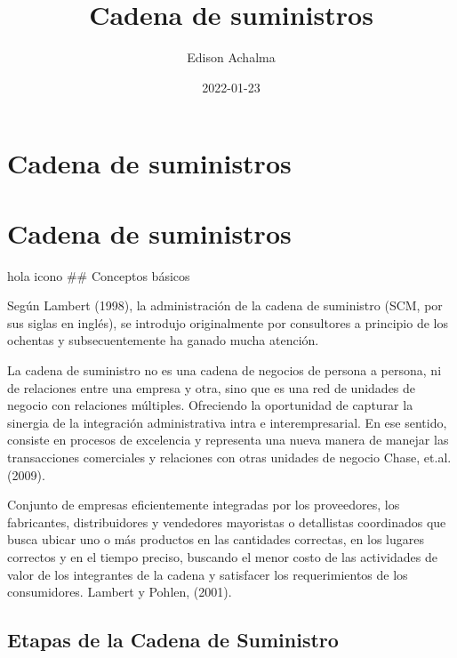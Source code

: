 \documentclass[
  jou,
  floatsintext,
  longtable,
  a4paper,
  nolmodern,
  notxfonts,
  notimes,
  colorlinks=true,linkcolor=blue,citecolor=blue,urlcolor=blue]{apa7}
\title{Cadena de suministros}
\author{Edison Achalma}
\affiliation{
{Escuela Profesional de Economía, Universidad Nacional de San Cristóbal
de Huamanga}}
\date{2022-01-23}
\begin{document}
\maketitle

\hypertarget{toc}{}
\tableofcontents
\newpage
\section[Introduction]{Cadena de suministros}

\setcounter{secnumdepth}{-\maxdimen} %

\setlength\LTleft{0pt}


\section{Cadena de suministros}\label{cadena-de-suministros}

hola icono \#\# Conceptos básicos

Según Lambert (1998), la administración de la cadena de suministro (SCM,
por sus siglas en inglés), se introdujo originalmente por consultores a
principio de los ochentas y subsecuentemente ha ganado mucha atención.

La cadena de suministro no es una cadena de negocios de persona a
persona, ni de relaciones entre una empresa y otra, sino que es una red
de unidades de negocio con relaciones múltiples. Ofreciendo la
oportunidad de capturar la sinergia de la integración administrativa
intra e interempresarial. En ese sentido, consiste en procesos de
excelencia y representa una nueva manera de manejar las transacciones
comerciales y relaciones con otras unidades de negocio Chase, et.al.
(2009).

Conjunto de empresas eficientemente integradas por los proveedores, los
fabricantes, distribuidores y vendedores mayoristas o detallistas
coordinados que busca ubicar uno o más productos en las cantidades
correctas, en los lugares correctos y en el tiempo preciso, buscando el
menor costo de las actividades de valor de los integrantes de la cadena
y satisfacer los requerimientos de los consumidores. Lambert y Pohlen,
(2001).

\subsection{Etapas de la Cadena de
Suministro}\label{etapas-de-la-cadena-de-suministro}
\end{document}
